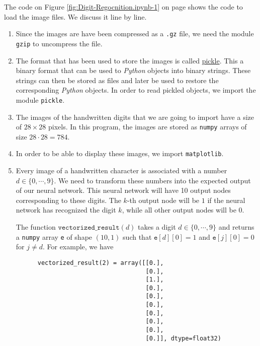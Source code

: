The code on Figure \ref{fig:Digit-Regocnition.ipynb-1} on page \pageref{fig:Digit-Regocnition.ipynb-1} shows the
code to load the image files.  We discuss it line by line.
\begin{enumerate}
\item Since the images are have been compressed as a \texttt{.gz} file, we need the module \texttt{gzip} to
      uncompress the file.
\item The format that has been used to store the images is called
      \href{https://docs.python.org/3.6/library/pickle.html}{pickle}.
      This a binary format that can be used to  \textsl{Python} objects into binary strings.  These
      strings can then be stored as files and later be used to restore the corresponding \textsl{Python} objects.  In order
      to read pickled objects, we import the module \texttt{pickle}.
\item The images of the handwritten digits that we are going to import have a size of $28 \times 28$ pixels.
      In this program, the images are stored as \texttt{numpy} arrays of size $28 \cdot 28 = 784$.
\item In order to be able to display these images, we import \texttt{matplotlib}.
\item Every image of a handwritten character is associated with a number $d \in \{0, \cdots, 9\}$.
      We need to transform these numbers into the expected output of our neural network.  This neural network
      will have 10 output nodes corresponding to these digits.  The $k$-th output node will be $1$
      if the neural network has recognized the digit $k$, while all other output nodes will be $0$.

      The function $\texttt{vectorized\_result}(d)$ takes a digit $d \in \{0,\cdots,9\}$ and returns a
      \texttt{numpy} array \texttt{e} of shape $(10, 1)$ such that $\texttt{e}[d][0]=1$ and $\texttt{e}[j][0]=0$ for
      $j\not=d$.  For example, we have
      \begin{verbatim}
      vectorized_result(2) = array([[0.],
                                    [0.],
                                    [1.],
                                    [0.],
                                    [0.],
                                    [0.],
                                    [0.],
                                    [0.],
                                    [0.],
                                    [0.]], dtype=float32)
      \end{verbatim}
      \vspace*{-0.5cm}
      

\end{enumerate}
